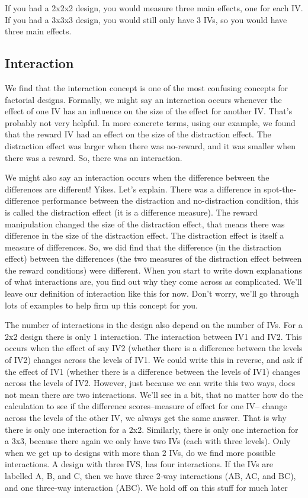 \documentclass[
]{book}
\begin{document}
If you had a 2x2x2 design, you would measure three main effects, one for each IV. If you had a 3x3x3 design, you would still only have 3 IVs, so you would have three main effects.

\subsection{Interaction}\label{interaction}

We find that the interaction concept is one of the most confusing concepts for factorial designs. Formally, we might say an interaction occurs whenever the effect of one IV has an influence on the size of the effect for another IV. That's probably not very helpful. In more concrete terms, using our example, we found that the reward IV had an effect on the size of the distraction effect. The distraction effect was larger when there was no-reward, and it was smaller when there was a reward. So, there was an interaction.

We might also say an interaction occurs when the difference between the differences are different! Yikes. Let's explain. There was a difference in spot-the-difference performance between the distraction and no-distraction condition, this is called the distraction effect (it is a difference measure). The reward manipulation changed the size of the distraction effect, that means there was difference in the size of the distraction effect. The distraction effect is itself a measure of differences. So, we did find that the difference (in the distraction effect) between the differences (the two measures of the distraction effect between the reward conditions) were different. When you start to write down explanations of what interactions are, you find out why they come across as complicated. We'll leave our definition of interaction like this for now. Don't worry, we'll go through lots of examples to help firm up this concept for you.

The number of interactions in the design also depend on the number of IVs. For a 2x2 design there is only 1 interaction. The interaction between IV1 and IV2. This occurs when the effect of say IV2 (whether there is a difference between the levels of IV2) changes across the levels of IV1. We could write this in reverse, and ask if the effect of IV1 (whether there is a difference between the levels of IV1) changes across the levels of IV2. However, just because we can write this two ways, does not mean there are two interactions. We'll see in a bit, that no matter how do the calculation to see if the difference scores--measure of effect for one IV-- change across the levels of the other IV, we always get the same answer. That is why there is only one interaction for a 2x2. Similarly, there is only one interaction for a 3x3, because there again we only have two IVs (each with three levels). Only when we get up to designs with more than 2 IVs, do we find more possible interactions. A design with three IVS, has four interactions. If the IVs are labelled A, B, and C, then we have three 2-way interactions (AB, AC, and BC), and one three-way interaction (ABC). We hold off on this stuff for much later
\end{document}
